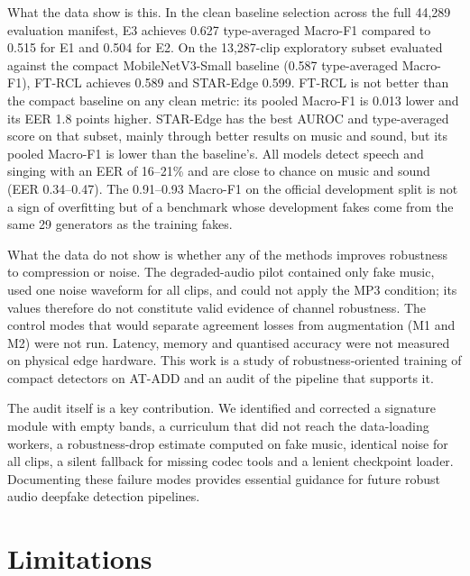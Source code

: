 \documentclass[12pt,a4paper]{report}
\begin{document}
What the data show is this. In the clean baseline selection across the full 44{,}289 evaluation manifest, E3 achieves 0.627 type-averaged Macro-F1 compared to 0.515 for E1 and 0.504 for E2. On the 13{,}287-clip exploratory subset evaluated against the compact MobileNetV3-Small baseline (0.587 type-averaged Macro-F1), FT-RCL achieves 0.589 and STAR-Edge 0.599. FT-RCL is not better than the compact baseline on any clean metric: its pooled Macro-F1 is 0.013 lower and its EER 1.8 points higher. STAR-Edge has the best AUROC and type-averaged score on that subset, mainly through better results on music and sound, but its pooled Macro-F1 is lower than the baseline's. All models detect speech and singing with an EER of 16--21\% and are close to chance on music and sound (EER 0.34--0.47). The 0.91--0.93 Macro-F1 on the official development split is not a sign of overfitting but of a benchmark whose development fakes come from the same 29 generators as the training fakes.

What the data do not show is whether any of the methods improves robustness to compression or noise. The degraded-audio pilot contained only fake music, used one noise waveform for all clips, and could not apply the MP3 condition; its values therefore do not constitute valid evidence of channel robustness. The control modes that would separate agreement losses from augmentation (M1 and M2) were not run. Latency, memory and quantised accuracy were not measured on physical edge hardware. This work is a study of robustness-oriented training of compact detectors on AT-ADD and an audit of the pipeline that supports it.

The audit itself is a key contribution. We identified and corrected a signature module with empty bands, a curriculum that did not reach the data-loading workers, a robustness-drop estimate computed on fake music, identical noise for all clips, a silent fallback for missing codec tools and a lenient checkpoint loader. Documenting these failure modes provides essential guidance for future robust audio deepfake detection pipelines.

\section{Limitations}
\end{document}
